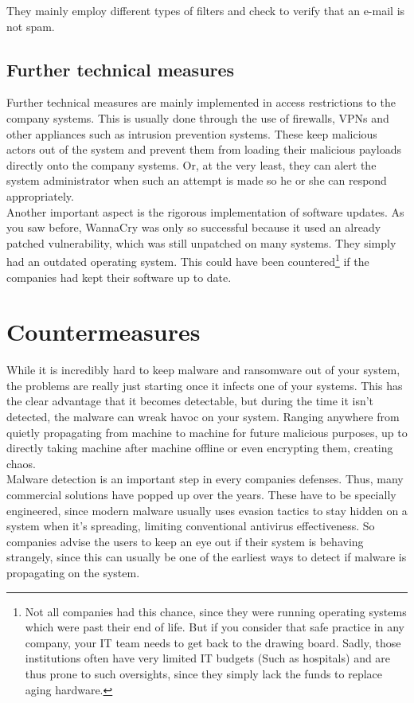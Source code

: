 They mainly employ different types of filters and check to verify that an e-mail is not spam.

\subsection{Further technical measures}

Further technical measures are mainly implemented in access restrictions to the company systems.
This is usually done through the use of firewalls, VPNs and other appliances such as intrusion prevention systems.
These keep malicious actors out of the system and prevent them from loading their malicious payloads directly onto the company systems.
Or, at the very least, they can alert the system administrator when such an attempt is made so he or she can respond appropriately.
\\

Another important aspect is the rigorous implementation of software updates.
As you saw before, WannaCry was only so successful because it used an already patched vulnerability, which was still unpatched on many systems.
They simply had an outdated operating system.
This could have been countered\footnote{Not all companies had this chance, since they were running operating systems which were past their end of life. But if you consider that safe practice in any company, your IT team needs to get back to the drawing board. Sadly, those institutions often have very limited IT budgets (Such as hospitals) and are thus prone to such oversights, since they simply lack the funds to replace aging hardware.} if the companies had kept their software up to date.

\section{Countermeasures}

While it is incredibly hard to keep malware and ransomware out of your system, the problems are really just starting once it infects one of your systems.
This has the clear advantage that it becomes detectable, but during the time it isn't detected, the malware can wreak havoc on your system.
Ranging anywhere from quietly propagating from machine to machine for future malicious purposes, up to directly taking machine after machine offline or even encrypting them, creating chaos.
\\

Malware detection is an important step in every companies defenses.
Thus, many commercial solutions have popped up over the years.
These have to be specially engineered, since modern malware usually uses evasion tactics to stay hidden on a system when it's spreading, limiting conventional antivirus effectiveness. %
So companies advise the users to keep an eye out if their system is behaving strangely, since this can usually be one of the earliest ways to detect if malware is propagating on the system.
\\

